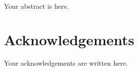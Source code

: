 \doublespacing

\noindent Your abstract is here. 

\cleardoublepage



\chapter*{\vspace*{-1.6in}Acknowledgements}

\vspace*{-0.3in}

Your acknowledgements are written here.



\tableofcontents


\listoffigures


\listoftables


